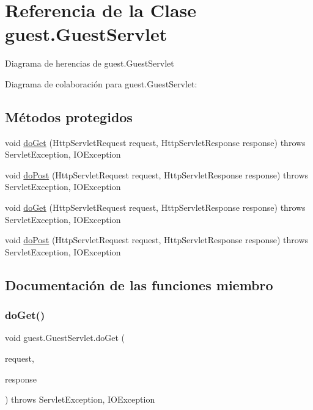 \hypertarget{classguest_1_1_guest_servlet}{}\section{Referencia de la Clase guest.\+Guest\+Servlet}
\label{classguest_1_1_guest_servlet}


Diagrama de herencias de guest.\+Guest\+Servlet


Diagrama de colaboración para guest.\+Guest\+Servlet\+:
\subsection*{Métodos protegidos}
\begin{DoxyCompactItemize}
\item 
void \mbox{\hyperlink{classguest_1_1_guest_servlet_af359e1e70b3678884a8300e284490041}{do\+Get}} (Http\+Servlet\+Request request, Http\+Servlet\+Response response)  throws Servlet\+Exception, I\+O\+Exception 
\item 
void \mbox{\hyperlink{classguest_1_1_guest_servlet_abd464d13df4606723ffedb2685269f01}{do\+Post}} (Http\+Servlet\+Request request, Http\+Servlet\+Response response)  throws Servlet\+Exception, I\+O\+Exception 
\item 
void \mbox{\hyperlink{classguest_1_1_guest_servlet_af359e1e70b3678884a8300e284490041}{do\+Get}} (Http\+Servlet\+Request request, Http\+Servlet\+Response response)  throws Servlet\+Exception, I\+O\+Exception 
\item 
void \mbox{\hyperlink{classguest_1_1_guest_servlet_abd464d13df4606723ffedb2685269f01}{do\+Post}} (Http\+Servlet\+Request request, Http\+Servlet\+Response response)  throws Servlet\+Exception, I\+O\+Exception 
\end{DoxyCompactItemize}


\subsection{Documentación de las funciones miembro}
\mbox{\label{classguest_1_1_guest_servlet_af359e1e70b3678884a8300e284490041}} 
\subsubsection{\texorpdfstring{doGet()}{doGet()}\hspace{0.1cm}{\footnotesize\ttfamily [1/2]}}
{\footnotesize\ttfamily void guest.\+Guest\+Servlet.\+do\+Get (\begin{DoxyParamCaption}\item[{Http\+Servlet\+Request}]{request,  }\item[{Http\+Servlet\+Response}]{response }\end{DoxyParamCaption}) throws Servlet\+Exception, I\+O\+Exception\hspace{0.3cm}{\ttfamily [protected]}}

